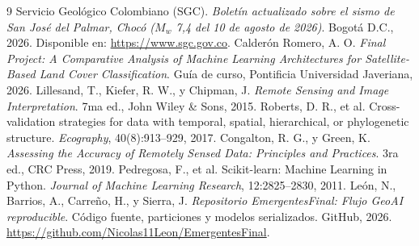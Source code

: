 \documentclass[11pt,a4paper]{article}
\begin{document}
\begin{thebibliography}{9}
\small
{}
Servicio Geológico Colombiano (SGC). \textit{Boletín actualizado sobre el sismo de San José del Palmar, Chocó ($M_w$ 7,4 del 10 de agosto de 2026)}. Bogotá D.C., 2026. Disponible en: \url{https://www.sgc.gov.co}.
Calderón Romero, A. O. \textit{Final Project: A Comparative Analysis of Machine Learning Architectures for Satellite-Based Land Cover Classification}. Guía de curso, Pontificia Universidad Javeriana, 2026.
Lillesand, T., Kiefer, R. W., y Chipman, J. \textit{Remote Sensing and Image Interpretation}. 7ma ed., John Wiley \& Sons, 2015.
Roberts, D. R., et al. Cross-validation strategies for data with temporal, spatial, hierarchical, or phylogenetic structure. \textit{Ecography}, 40(8):913--929, 2017.
Congalton, R. G., y Green, K. \textit{Assessing the Accuracy of Remotely Sensed Data: Principles and Practices}. 3ra ed., CRC Press, 2019.
Pedregosa, F., et al. Scikit-learn: Machine Learning in Python. \textit{Journal of Machine Learning Research}, 12:2825--2830, 2011.
León, N., Barrios, A., Carreño, H., y Sierra, J. \textit{Repositorio EmergentesFinal: Flujo GeoAI reproducible}. Código fuente, particiones y modelos serializados. GitHub, 2026. \url{https://github.com/Nicolas11Leon/EmergentesFinal}.
\end{thebibliography}
\end{document}
